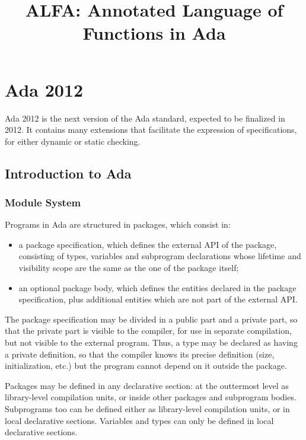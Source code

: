 \documentclass[fullpage]{article}
\title{ALFA: Annotated Language of Functions in Ada}
\begin{document}
\maketitle
\sloppy
\section{Ada 2012}

Ada 2012 is the next version of the Ada standard, expected to be finalized in
2012. It contains many extensions that facilitate the expression of
specifications, for either dynamic or static checking.

\subsection{Introduction to Ada}

\subsubsection{Module System}

Programs in Ada are structured in packages, which consist in:
\begin{itemize}
\item a package specification, which defines the external API of the package,
  consisting of types, variables and subprogram declarations whose lifetime and
  visibility scope are the same as the one of the package itself;
\item an optional package body, which defines the entities declared in the
  package specification, plus additional entities which are not part of the
  external API.
\end{itemize}

The package specification may be divided in a public part and a private part,
so that the private part is visible to the compiler, for use in separate
compilation, but not visible to the external program. Thus, a type may be
declared as having a private definition, so that the compiler knows its precise
definition (size, initialization, etc.) but the program cannot depend on it
outside the package.

Packages may be defined in any declarative section: at the outtermost level as
library-level compilation units, or inside other packages and subprogram
bodies. Subprograms too can be defined either as library-level compilation
units, or in local declarative sections. Variables and types can only be
defined in local declarative sections.
\end{document}
